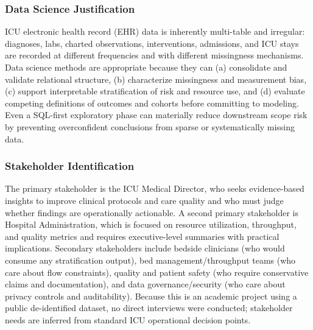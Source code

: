 \documentclass[12pt]{article}
\begin{document}
\subsubsection*{Data Science Justification}
ICU electronic health record (EHR) data is inherently multi-table and irregular: diagnoses, labs, charted observations, interventions, admissions, and ICU stays are recorded at different frequencies and with different missingness mechanisms. Data science methods are appropriate because they can (a) consolidate and validate relational structure, (b) characterize missingness and measurement bias, (c) support interpretable stratification of risk and resource use, and (d) evaluate competing definitions of outcomes and cohorts before committing to modeling. Even a SQL-first exploratory phase can materially reduce downstream scope risk by preventing overconfident conclusions from sparse or systematically missing data.

\subsubsection*{Stakeholder Identification}
The primary stakeholder is the ICU Medical Director, who seeks evidence-based insights to improve clinical protocols and care quality and who must judge whether findings are operationally actionable. A second primary stakeholder is Hospital Administration, which is focused on resource utilization, throughput, and quality metrics and requires executive-level summaries with practical implications. Secondary stakeholders include bedside clinicians (who would consume any stratification output), bed management/throughput teams (who care about flow constraints), quality and patient safety (who require conservative claims and documentation), and data governance/security (who care about privacy controls and auditability). Because this is an academic project using a public de-identified dataset, no direct interviews were conducted; stakeholder needs are inferred from standard ICU operational decision points.
\end{document}
